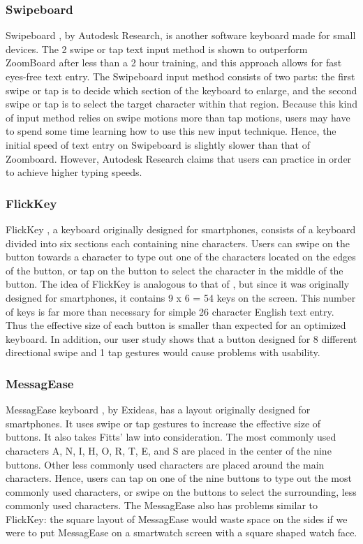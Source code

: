 \subsubsection{Swipeboard}
Swipeboard \cite{swipeboard}, by Autodesk Research, is another software keyboard made for small devices. The 2 swipe or tap text input method is shown to outperform ZoomBoard after less than a 2 hour training, and this approach allows for fast eyes-free text entry. The Swipeboard input method consists of two parts: the first swipe or tap is to decide which section of the keyboard to enlarge, and the second swipe or tap is to select the target character within that region. Because this kind of input method relies on swipe motions more than tap motions, users may have to spend some time learning how to use this new input technique. Hence, the initial speed of text entry on Swipeboard is slightly slower than that of Zoomboard. However, Autodesk Research claims that users can practice in order to achieve higher typing speeds.

\subsubsection{FlickKey}
FlickKey \cite{flickkey}, a keyboard originally designed for smartphones, consists of a keyboard divided into six sections each containing nine characters. Users can swipe on the button towards a character to type out one of the characters located on the edges of the button, or tap on the button to select the character in the middle of the button. The idea of FlickKey is analogous to that of \papertitle, but since it was originally designed for smartphones, it contains 9 x 6 = 54 keys on the screen. This number of keys is far more than necessary for simple 26 character English text entry. Thus the effective size of each button is smaller than expected for an optimized keyboard. In addition, our user study shows that a button designed for 8 different directional swipe and 1 tap gestures would cause problems with usability.

\subsubsection{MessagEase}
MessagEase keyboard \cite{messageease}, by Exideas, has a layout originally designed for smartphones. It uses swipe or tap gestures to increase the effective size of buttons. It also takes Fitts' law into consideration. The most commonly used characters A, N, I, H, O, R, T, E, and S are placed in the center of the nine buttons. Other less commonly used characters are placed around the main characters. Hence, users can tap on one of the nine buttons to type out the most commonly used characters, or swipe on the buttons to select the surrounding, less commonly used characters. The MessagEase also has problems similar to FlickKey: the square layout of MessagEase would waste space on the sides if we were to put MessagEase on a smartwatch screen with a square shaped watch face.

